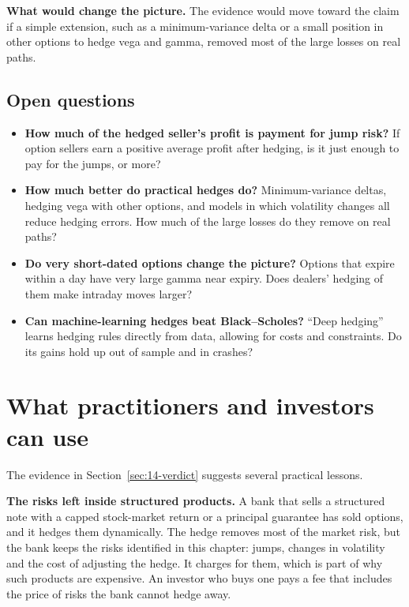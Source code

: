 \textbf{What would change the picture.} The evidence would move toward the claim if a simple extension, such as a minimum-variance delta or a small position in other options to hedge vega and gamma, removed most of the large losses on real paths.

\subsection{Open questions}
\label{sec:14-open}

\begin{itemize}
  \item \textbf{How much of the hedged seller's profit is payment for jump risk?} If option sellers earn a positive average profit after hedging, is it just enough to pay for the jumps, or more?
  \item \textbf{How much better do practical hedges do?} Minimum-variance deltas, hedging vega with other options, and models in which volatility changes all reduce hedging errors. How much of the large losses do they remove on real paths?
  \item \textbf{Do very short-dated options change the picture?} Options that expire within a day have very large gamma near expiry. Does dealers' hedging of them make intraday moves larger?
  \item \textbf{Can machine-learning hedges beat Black--Scholes?} ``Deep hedging'' learns hedging rules directly from data, allowing for costs and constraints. Do its gains hold up out of sample and in crashes?
\end{itemize}

\section{What practitioners and investors can use}
\label{sec:14-investors}

The evidence in Section~\ref{sec:14-verdict} suggests several practical lessons.

\textbf{The risks left inside structured products.} A bank that sells a structured note with a capped stock-market return or a principal guarantee has sold options, and it hedges them dynamically. The hedge removes most of the market risk, but the bank keeps the risks identified in this chapter: jumps, changes in volatility and the cost of adjusting the hedge. It charges for them, which is part of why such products are expensive. An investor who buys one pays a fee that includes the price of risks the bank cannot hedge away.

